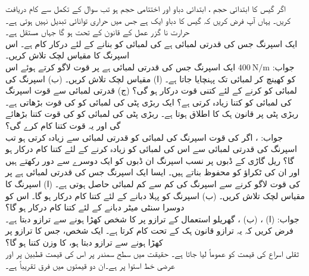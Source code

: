 اگر گیس کا ابتدائی حجم ، ابتدائی دباو  اور اختتامی حجم  ہو تب سوال  کے تکمل سے کام دریافت کریں۔ یہاں آپ فرض کریں کہ گیس کا دباو ایک  ہے جس میں حراری توانائی تبدیل نہیں ہوتی ہے۔ حرارت نا گزر عمل کے قانون کے تحت  ہو گا جہاں  مستقل ہے۔ 
\\
ایک اسپرنگ جس کی قدرتی لمبائی  ہے کی لمبائی کو  بنانے کے لئے درکار کام  ہے۔ اس اسپرنگ کا مقیاس لچک تلاش کریں۔\\
جواب:\quad
$\SI{400}{\newton\per\meter}$
ایک اسپرنگ جس کی قدرتی لمبائی  ہے پر  قوت لاگو کرتے ہوئے اس  کو کھینچ کر  لمبائی تک پہنچایا جاتا ہے۔ (ا) مقیاس لچک تلاش کریں۔ (ب) اسپرنگ کی لمبائی کو  کرنے کے لئے کتنی قوت درکار ہو گی؟ (ج) قدرتی لمبائی سے  قوت اسپرنگ کی لمبائی کو کتنا زیادہ کرتی ہے؟
ایک ربڑی پٹی کی لمبائی کو  کی قوت  بڑھاتی ہے۔ ربڑی پٹی پر قانون ہک کا اطلاق ہوتا ہے۔ ربڑی پٹی کی لمبائی کو  کی قوت کتنا بڑھائے گی اور یہ قوت کتنا کام کرے گی؟\\
جواب:\quad
{}، 
اگر  کی قوت اسپرنگ کی لمبائی کو قدرتی لمبائی سے  زیادہ کرتی ہو تب اسپرنگ کی قدرتی لمبائی سے اس کی لمبائی کو  زیادہ کرنے کے لئے کتنا کام درکار ہو گا؟
ریل گاڑی کے ڈبوں پر نسب اسپرنگ ان ڈبوں کو ایک دوسرے سے دور رکھتے ہیں اور ان کی ٹکراؤ کو محفوظ بناتے ہیں۔ ایسا ایک اسپرنگ جس کی قدرتی لمبائی  ہے پر  کی قوت  لاگو کرنے سے اسپرنگ کی کم سے کم لمبائی  حاصل ہوتی ہے۔ (ا) اسپرنگ کا مقیاس لچک تلاش کریں۔ (ب) اسپرنگ کو پہلا  دبانے کے لئے کتنا کام درکار ہو گا۔ اس کو دوسرا سنٹی میٹر دبانے کے لئے کتنا کام درکار ہو گا؟\\
جواب:\quad
(ا) ، (ب) ، 
گھریلو استعمال کے ترازو پر  کا شخص کھڑا ہونے سے ترازو  دبتا ہے۔ فرض کریں کہ یہ ترازو قانون ہک کے تحت کام کرتا ہے۔ ایک شخص، جس کا ترازو پر کھڑا ہونے سے ترازو  دبتا ہو، کا وزن کتنا ہو گا؟
\\
ثقلی اسراع کی قیمت کو عموماً  لیا جاتا ہے۔ حقیقت میں سطح سمندر پر اس کی قیمت قطبین پر  اور  عرضی خط استوا پر  ہے۔ان دو قیمتوں میں فرق تقریباً  ہے۔


